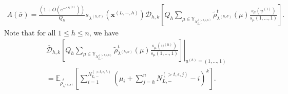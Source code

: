 \documentclass[11pt]{amsart}
\theoremstyle{plain}
\theoremstyle{definition}
\theoremstyle{remark}
\newcommand\ol{\overline}
\newcommand\si{\sigma}
\newcommand\YY{\mathbb{Y}}
\numberwithin{equation}{section}
\numberwithin{theorem}{section}
\numberwithin{figure}{section}
\begin{document}
\begin{small}
\begin{align*}
A(\ol{\si})=\frac{(1+O(e^{-cN^{(\epsilon)}}))}{Q_h}
s_{\lambda^{(h,\sigma)}}(\mathbf{x}^{(L,-,h)})
\ol{\mathcal{D}}_{h,k}\left[Q_h\sum_{\mu\in \YY_{N_{L,-}^{(>t,\epsilon,h)}}}\tilde{\rho}^t_{\lambda^{(h,\si)}}(\mu)
\frac{s_{\mu}(\underline{u}^{(1)})}{s_{\mu}(1,\ldots,1)}\right].
\end{align*}
Note that for all $1\leq h\leq n$, we have
\begin{align*}
&\left.\ol{\mathcal{D}}_{h,k}\left[Q_h\sum_{\mu\in \YY_{N_{L,-}^{(>t,\epsilon,h)}}}\tilde{\rho}^t_{\lambda^{(h,\si)}}(\mu)
\frac{s_{\mu}(\underline{u}^{(h)})}{s_{\mu}(1,\ldots,1)}\right]\right|_{\underline{u}^{(h)}=(1,\ldots,1)}\\
&=\mathbb{E}_{\tilde{\rho}^t_{\lambda^{(h,\sigma)}}}\left[\sum_{i=1}^{N_{L,-}^{(>t,\epsilon,h)}}\left(\mu_i+\sum_{j=h}^{n}N_{L,-}^{(>t,\epsilon,j)}-i\right)^k\right].
\end{align*}
\end{small}
\end{document}
